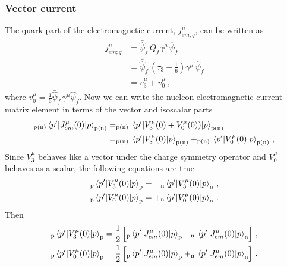   \subsubsection{Vector current}

    The quark part of the electromagnetic current, $j^{\mu}_{em;q}$, can be
    written as~\cite{Alberico:2001sd}
    \begin{equation}\label{eq:emcurrent30}
      \begin{aligned}
        j^{\mu}_{em;q} &= \bar{\hat{\psi}}_f \, Q_f \gamma^{\mu}\, \hat{\psi}_f \\
                       &= \bar{\hat{\psi}}_f \, (\tau_3 + \frac{1}{6})\gamma^{\mu} \, \hat{\psi}_f \\
                       &= v^{\mu}_3 + v^{\mu}_0 \,,
      \end{aligned}
    \end{equation}
    where $v^{\mu}_0 = \frac{1}{6}\bar{\hat{\psi}}_f \, \gamma^{\mu}
    \hat{\psi}_f$. Now we can write the nucleon electromagnetic current matrix
    element in terms of the vector and isoscalar parts
    \begin{equation}
      \begin{aligned}
        _{\textrm{p(n)}}\mel{p'}{J^{\mu}_{em}(0)}{p}_{\textrm{p(n)}} 
            &= _{\textrm{p(n)}}\mel{p'}{V^{\mu}_3(0) + V^{\mu}_0(0))}{p}_{\textrm{p(n)}} \\
            &= _{\textrm{p(n)}}\mel{p'}{V^{\mu}_3(0)}{p}_{\textrm{p(n)}} 
             + _{\textrm{p(n)}}\mel{p'}{V^{\mu}_0(0)}{p}_{\textrm{p(n)}} \,,
      \end{aligned}
    \end{equation}
    Since $V^{\mu}_3$ behaves like a vector under the charge symmetry operator and
    $V^{\mu}_0$ behaves as a scalar, the following equations are true
    \begin{equation}
      \begin{aligned}
        _{\textrm{p}}\mel{p'}{V^{\mu}_3(0)}{p}_{\textrm{p}} 
          &= - _{\textrm{n}}\mel{p'}{V^{\mu}_3(0)}{p}_{\textrm{n}} \,, \\
        _{\textrm{p}}\mel{p'}{V^{\mu}_0(0)}{p}_{\textrm{p}} 
          &= + _{\textrm{n}}\mel{p'}{V^{\mu}_0(0)}{p}_{\textrm{n}} \,. \\
      \end{aligned}
    \end{equation}
    Then
    \begin{align}\label{eq:V3em}
      _{\textrm{p}}\mel{p'}{V^{\mu}_3(0)}{p}_{\textrm{p}} 
        &= \frac{1}{2} \left[_{\textrm{p}}\mel{p'}{J^{\mu}_{em}(0)}{p}_{\textrm{p}} 
         - _{\textrm{n}}\mel{p'}{J^{\mu}_{em}(0)}{p}_{\textrm{n}} \right] \,, \\
      _{\textrm{p}}\mel{p'}{V^{\mu}_0(0)}{p}_{\textrm{p}} 
        &= \frac{1}{2} \left[_{\textrm{p}}\mel{p'}{J^{\mu}_{em}(0)}{p}_{\textrm{p}} 
         + _{\textrm{n}}\mel{p'}{J^{\mu}_{em}(0)}{p}_{\textrm{n}} \right] \,.
    \end{align}
